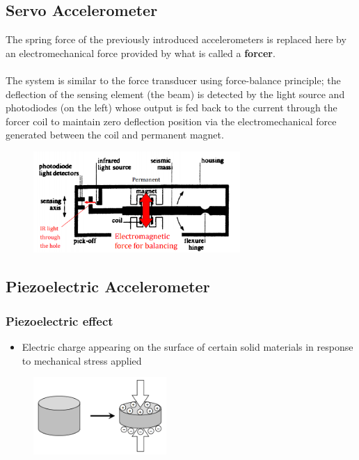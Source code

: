 \documentclass[class=report, crop=false, 12pt,a4paper]{standalone}
\begin{document}
\subsection{Servo Accelerometer}
The spring force of the previously introduced accelerometers is replaced here by an electromechanical force provided by what is called a \textbf{forcer}. \\\\
The system is similar to the force transducer using force-balance principle; the deflection of the sensing element (the beam) is detected by the light source and photodiodes (on the left) whose output is fed back to the current through the forcer coil to maintain zero deflection position via the electromechanical force generated between the coil and permanent magnet.
\begin{figure}[H]
  \centering
  \includegraphics[width = 0.7\textwidth]{../img/Mdiagram37.png}
\end{figure}
\subsection{Piezoelectric Accelerometer}
\subsubsection{Piezoelectric effect}
\begin{itemize}
  \item Electric charge appearing on the surface of certain solid materials in response to mechanical stress applied
\end{itemize}
\begin{figure}[H]
  \centering
  \includegraphics[width = 0.45\textwidth]{../img/Mdiagram38.png}
\end{figure}
\end{document}
